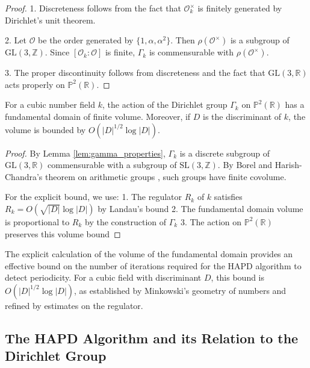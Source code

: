 \begin{proof}
1. Discreteness follows from the fact that $\mathcal{O}_k^\times$ is finitely generated by Dirichlet's unit theorem.

2. Let $\mathcal{O}$ be the order generated by $\{1, \alpha, \alpha^2\}$. Then $\rho(\mathcal{O}^\times)$ is a subgroup of $\text{GL}(3, \mathbb{Z})$. Since $[\mathcal{O}_k : \mathcal{O}]$ is finite, $\Gamma_k$ is commensurable with $\rho(\mathcal{O}^\times)$.

3. The proper discontinuity follows from discreteness and the fact that $\text{GL}(3, \mathbb{R})$ acts properly on $\mathbb{P}^2(\mathbb{R})$.
\end{proof}

\begin{theorem}\label{thm:finite_volume}
For a cubic number field $k$, the action of the Dirichlet group $\Gamma_k$ on $\mathbb{P}^2(\mathbb{R})$ has a fundamental domain of finite volume. Moreover, if $D$ is the discriminant of $k$, the volume is bounded by $O(|D|^{1/2} \log|D|)$.
\end{theorem}

\begin{proof}
By Lemma \ref{lem:gamma_properties}, $\Gamma_k$ is a discrete subgroup of $\text{GL}(3, \mathbb{R})$ commensurable with a subgroup of $\text{SL}(3, \mathbb{Z})$. By Borel and Harish-Chandra's theorem on arithmetic groups \cite{BH62}, such groups have finite covolume.

For the explicit bound, we use:
1. The regulator $R_k$ of $k$ satisfies $R_k = O(\sqrt{|D|}\log|D|)$ by Landau's bound
2. The fundamental domain volume is proportional to $R_k$ by the construction of $\Gamma_k$
3. The action on $\mathbb{P}^2(\mathbb{R})$ preserves this volume bound
\end{proof}

\begin{remark}
The explicit calculation of the volume of the fundamental domain provides an effective bound on the number of iterations required for the HAPD algorithm to detect periodicity. For a cubic field with discriminant $D$, this bound is $O(|D|^{1/2} \log|D|)$, as established by Minkowski's geometry of numbers and refined by estimates on the regulator.
\end{remark}

\subsection{The HAPD Algorithm and its Relation to the Dirichlet Group}

